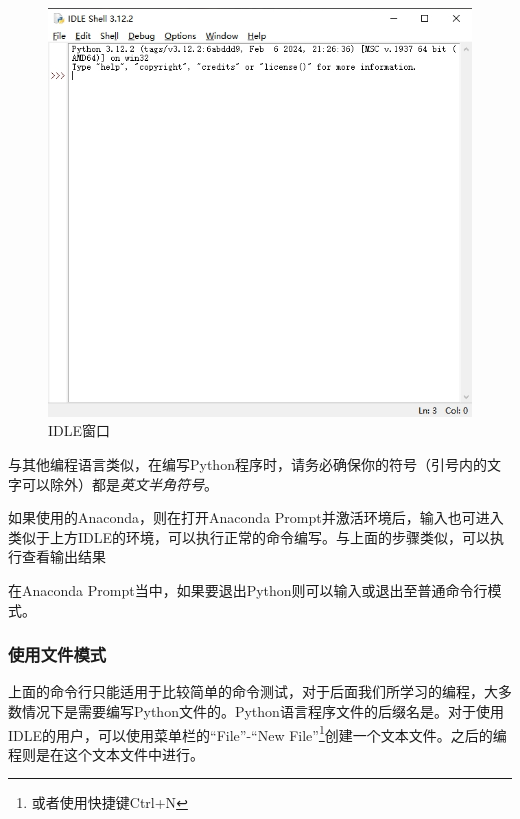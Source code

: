 \begin{figure}
    \centering
    \includegraphics[width=1\linewidth]{Python与机器学习/基础Python语法/安装Python/fig/IDLE窗口.png}
    \caption{IDLE窗口}
    \label{fig:安装Python-IDLE窗口}
\end{figure}

\begin{attention}
    与其他编程语言类似，在编写Python程序时，请务必确保你的符号（引号内的文字可以除外）都是\emph{英文半角符号}。
\end{attention}

如果使用的Anaconda，则在打开Anaconda Prompt并激活环境后，输入也可进入类似于上方IDLE的环境，可以执行正常的命令编写。与上面的步骤类似，可以执行查看输出结果

\begin{attention}
    在Anaconda Prompt当中，如果要退出Python则可以输入或退出至普通命令行模式。
\end{attention}

\subsubsection{使用文件模式}

上面的命令行只能适用于比较简单的命令测试，对于后面我们所学习的编程，大多数情况下是需要编写Python文件的。Python语言程序文件的后缀名是。对于使用IDLE的用户，可以使用菜单栏的“File”-“New File”\footnote{或者使用快捷键Ctrl+N}创建一个文本文件。之后的编程则是在这个文本文件中进行。

